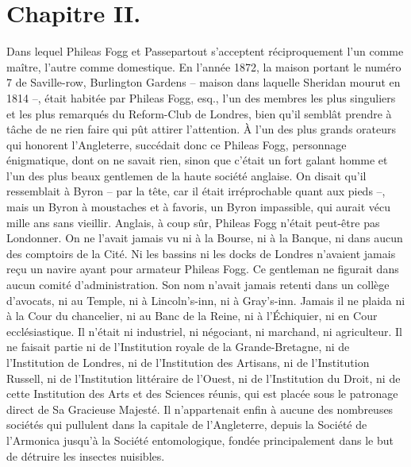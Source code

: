 \documentclass[12pt,a4paper,openany]{book}
\begin{document}
            \chapter{Chapitre II.}
            
            
            Dans lequel Phileas Fogg et Passepartout s’acceptent réciproquement l’un comme maître, l’autre comme domestique.
                En l’année 1872, la maison portant le numéro 7 de Saville-row, Burlington Gardens – maison dans laquelle Sheridan mourut en 1814 –, était habitée par Phileas Fogg, esq., l’un des membres les plus singuliers et les plus remarqués du Reform-Club de Londres, bien qu’il semblât prendre à tâche de ne rien faire qui pût attirer l’attention.
                À l’un des plus grands orateurs qui honorent l’Angleterre, succédait donc ce Phileas Fogg, personnage énigmatique, dont on ne savait rien, sinon que c’était un fort galant homme et l’un des plus beaux gentlemen de la haute société anglaise.
                On disait qu’il ressemblait à Byron – par la tête, car il était irréprochable quant aux pieds –, mais un Byron à moustaches et à favoris, un Byron impassible, qui aurait vécu mille ans sans vieillir.
                Anglais, à coup sûr, Phileas Fogg n’était peut-être pas Londonner. On ne l’avait jamais vu ni à la Bourse, ni à la Banque, ni dans aucun des comptoirs de la Cité. Ni les bassins ni les docks de Londres n’avaient jamais reçu un navire ayant pour armateur Phileas Fogg. Ce gentleman ne figurait dans aucun comité d’administration. Son nom n’avait jamais retenti dans un collège d’avocats, ni au Temple, ni à Lincoln’s-inn, ni à Gray’s-inn. Jamais il ne plaida ni à la Cour du chancelier, ni au Banc de la Reine, ni à l’Échiquier, ni en Cour ecclésiastique. Il n’était ni industriel, ni négociant, ni marchand, ni agriculteur. Il ne faisait partie ni de l’Institution royale de la Grande-Bretagne, ni de l’Institution de Londres, ni de l’Institution des Artisans, ni de l’Institution Russell, ni de l’Institution littéraire de l’Ouest, ni de l’Institution du Droit, ni de cette Institution des Arts et des Sciences réunis, qui est placée sous le patronage direct de Sa Gracieuse Majesté. Il n’appartenait enfin à aucune des nombreuses sociétés qui pullulent dans la capitale de l’Angleterre, depuis la Société de l’Armonica jusqu’à la Société entomologique, fondée principalement dans le but de détruire les insectes nuisibles.
\end{document}
